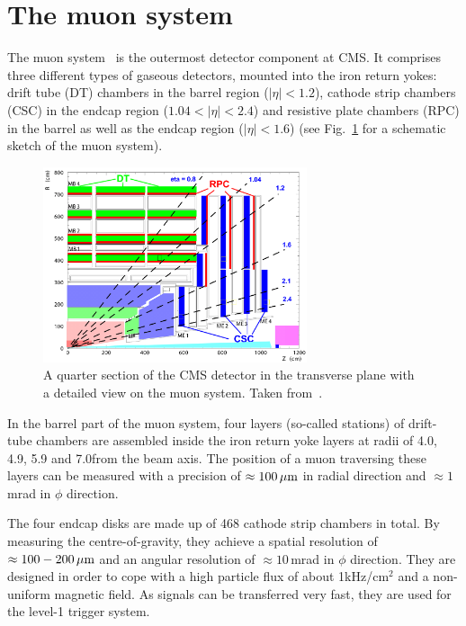 \section{The muon system}
\label{sec:MuonSystem}
The muon system~\cite{bib:CMS:TDR_2006,bib:CMS:TDR_MuonSystem} is the outermost detector component at CMS.
It comprises three different types of gaseous detectors, mounted into the iron return yokes: drift tube (DT) chambers in the barrel region ($|\eta|<1.2$), cathode strip chambers (CSC) in the endcap region ($1.04<|\eta|<2.4$) and resistive plate chambers (RPC) in the barrel as well as the endcap region ($|\eta|<1.6$) (see Fig.~\ref{fig:MuonSystem} for a schematic sketch of the muon system).
\begin{figure}[!b]
  \centering
      \includegraphics[width=0.69\textwidth]{figures/experiment/CMS/Figures_Experimental_Apparatus_MuonDetector.png}
  \caption{A quarter section of the CMS detector in the transverse plane with a detailed view on the muon system. Taken from~\cite{bib:CMS:TDR_2006}.}  
  \label{fig:MuonSystem}
\end{figure}
In the barrel part of the muon system, four layers (so-called stations) of drift-tube chambers are assembled inside the iron return yoke layers at radii of 4.0, 4.9, 5.9 and 7.0\m from the beam axis.
The position of a muon traversing these layers can be measured with a precision of $\approx 100\,\mu\text{m}$ in radial direction and $\approx 1\,$mrad in $\phi$ direction. 

The four endcap disks are made up of 468 cathode strip chambers in total.
By measuring the centre-of-gravity, they achieve a spatial resolution of $\approx 100-200\,\mu\text{m}$ and an angular resolution of $\approx 10\,$mrad in $\phi$ direction.
They are designed in order to cope with a high particle flux of about 1kHz/cm$^2$ and a non-uniform magnetic field.
As signals can be transferred very fast, they are used for the level-1 trigger system.

